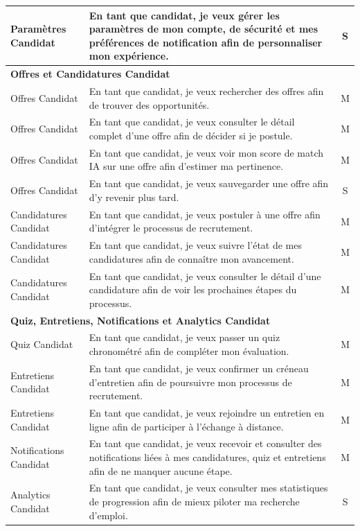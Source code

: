 \begin{longtable}{|p{3.5cm}|p{10cm}|c|}
Paramètres Candidat & En tant que candidat, je veux gérer les paramètres de mon compte, de sécurité et mes préférences de notification afin de personnaliser mon expérience. & S \\ \hline
\multicolumn{3}{|l|}{\textbf{Offres et Candidatures Candidat}} \\ \hline
Offres Candidat & En tant que candidat, je veux rechercher des offres afin de trouver des opportunités. & M \\ \hline
Offres Candidat & En tant que candidat, je veux consulter le détail complet d'une offre afin de décider si je postule. & M \\ \hline
Offres Candidat & En tant que candidat, je veux voir mon score de match IA sur une offre afin d'estimer ma pertinence. & M \\ \hline
Offres Candidat & En tant que candidat, je veux sauvegarder une offre afin d'y revenir plus tard. & S \\ \hline
Candidatures Candidat & En tant que candidat, je veux postuler à une offre afin d'intégrer le processus de recrutement. & M \\ \hline
Candidatures Candidat & En tant que candidat, je veux suivre l'état de mes candidatures afin de connaître mon avancement. & M \\ \hline
Candidatures Candidat & En tant que candidat, je veux consulter le détail d'une candidature afin de voir les prochaines étapes du processus. & M \\ \hline
\multicolumn{3}{|l|}{\textbf{Quiz, Entretiens, Notifications et Analytics Candidat}} \\ \hline
Quiz Candidat & En tant que candidat, je veux passer un quiz chronométré afin de compléter mon évaluation. & M \\ \hline
Entretiens Candidat & En tant que candidat, je veux confirmer un créneau d'entretien afin de poursuivre mon processus de recrutement. & M \\ \hline
Entretiens Candidat & En tant que candidat, je veux rejoindre un entretien en ligne afin de participer à l'échange à distance. & M \\ \hline
Notifications Candidat & En tant que candidat, je veux recevoir et consulter des notifications liées à mes candidatures, quiz et entretiens afin de ne manquer aucune étape. & M \\ \hline
Analytics Candidat & En tant que candidat, je veux consulter mes statistiques de progression afin de mieux piloter ma recherche d'emploi. & S \\ \hline

\end{longtable}
